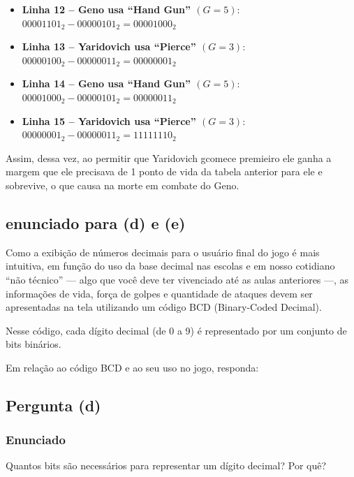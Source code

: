 \documentclass[12pt]{article}
\begin{document}
\begin{itemize}
\item \textbf{Linha 12 – Geno usa ``Hand Gun'' $(G=5)$}: $00001101_2 - 00000101_2 = 00001000_2$
\vspace{0.1cm}

\item \textbf{Linha 13 – Yaridovich usa ``Pierce'' $(G=3)$}: $00000100_2 - 00000011_2 = 00000001_2$
\vspace{0.1cm}

\item \textbf{Linha 14 – Geno usa ``Hand Gun'' $(G=5)$}: $00001000_2 - 00000101_2 = 00000011_2$
\vspace{0.1cm}

\item \textbf{Linha 15 – Yaridovich usa ``Pierce'' $(G=3)$}: $00000001_2 - 00000011_2 = 11111110_2$
\vspace{0.1cm}

\end{itemize}

Assim, dessa vez, ao permitir que Yaridovich gcomece premieiro ele ganha a margem que ele precisava de 1 ponto de vida da tabela anterior para ele e sobrevive, o que causa na morte em combate do Geno.

\subsection{enunciado para (d) e (e)}
\begin{tcolorbox}[title=Enunciado da Questão,colback=gray!5,colframe=black]

Como a exibição de números decimais para o usuário final do jogo é mais intuitiva,
em função do uso da base decimal nas escolas e em nosso cotidiano ``não técnico'' —
algo que você deve ter vivenciado até as aulas anteriores —, as informações de vida,
força de golpes e quantidade de ataques devem ser apresentadas na tela utilizando
um código BCD (Binary-Coded Decimal).

Nesse código, cada dígito decimal (de 0 a 9) é representado por um conjunto de bits
binários.

Em relação ao código BCD e ao seu uso no jogo, responda:

\end{tcolorbox}

\subsection{Pergunta (d)}

\subsubsection*{Enunciado}
Quantos bits são necessários para representar um dígito decimal? Por quê?
\end{document}
